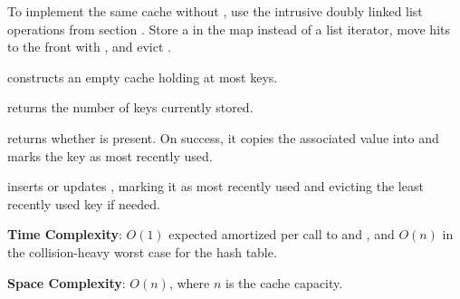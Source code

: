 To implement the same cache without , use the intrusive doubly linked list operations from section . Store a  in the map instead of a list iterator, move hits to the front with , and evict .

\begin{compactitem}
  \item {} constructs an empty cache holding at most  keys.
  \item {} returns the number of keys currently stored.
  \item {} returns whether  is present. On success, it copies the associated value into  and marks the key as most recently used.
  \item {} inserts or updates , marking it as most recently used and evicting the least recently used key if needed.
\end{compactitem}

\textbf{Time Complexity}: $O(1)$ expected amortized per call to  and , and $O(n)$ in the collision-heavy worst case for the hash table.

\textbf{Space Complexity}: $O(n)$, where $n$ is the cache capacity.

